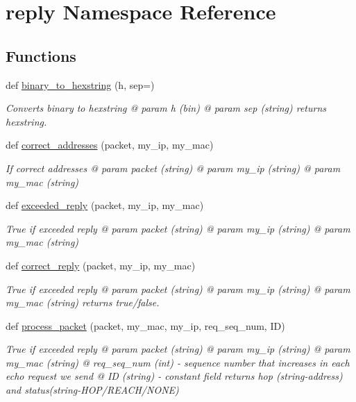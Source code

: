\hypertarget{namespacereply}{}\section{reply Namespace Reference}
\label{namespacereply}
\subsection*{Functions}
\begin{DoxyCompactItemize}
\item 
\mbox{\label{namespacereply_a1f0d487d6345a21b962e10469323752d}} 
def \hyperlink{namespacereply_a1f0d487d6345a21b962e10469323752d}{binary\+\_\+to\+\_\+hexstring} (h, sep=\textquotesingle{}\textquotesingle{})
\begin{DoxyCompactList}\small\item\em Converts binary to hexstring @ param h (bin) @ param sep (string) returns hexstring. \end{DoxyCompactList}\item 
def \hyperlink{namespacereply_ad9c1e99c3980b4b1dfd1f7a6a5bb8683}{correct\+\_\+addresses} (packet, my\+\_\+ip, my\+\_\+mac)
\begin{DoxyCompactList}\small\item\em If correct addresses @ param packet (string) @ param my\+\_\+ip (string) @ param my\+\_\+mac (string) \end{DoxyCompactList}\item 
def \hyperlink{namespacereply_ad152c5c2603b1c92f0ef5c5760e62e7d}{exceeded\+\_\+reply} (packet, my\+\_\+ip, my\+\_\+mac)
\begin{DoxyCompactList}\small\item\em True if exceeded reply @ param packet (string) @ param my\+\_\+ip (string) @ param my\+\_\+mac (string) \end{DoxyCompactList}\item 
def \hyperlink{namespacereply_a8fecb9b3744fbc25a42bcbb747e641fa}{correct\+\_\+reply} (packet, my\+\_\+ip, my\+\_\+mac)
\begin{DoxyCompactList}\small\item\em True if exceeded reply @ param packet (string) @ param my\+\_\+ip (string) @ param my\+\_\+mac (string) returns true/false. \end{DoxyCompactList}\item 
def \hyperlink{namespacereply_adb013751d024e7ccadaaffaf62a5cf39}{process\+\_\+packet} (packet, my\+\_\+mac, my\+\_\+ip, req\+\_\+seq\+\_\+num, ID)
\begin{DoxyCompactList}\small\item\em True if exceeded reply @ param packet (string) @ param my\+\_\+ip (string) @ param my\+\_\+mac (string) @ req\+\_\+seq\+\_\+num (int) -\/ sequence number that increases in each echo request we send @ ID (string) -\/ constant field returns hop (string-\/address) and status(string-\/\+H\+O\+P/\+R\+E\+A\+C\+H/\+N\+O\+NE) \end{DoxyCompactList}\end{DoxyCompactItemize}



